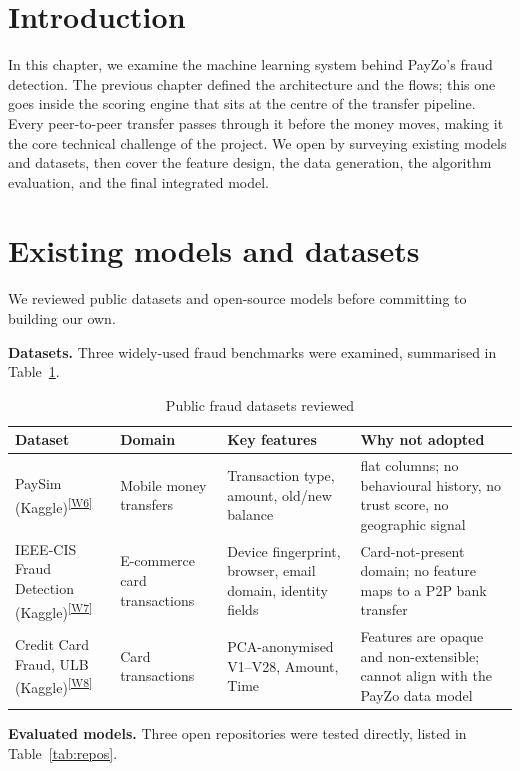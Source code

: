 \documentclass[12pt,a4paper]{report}
\newcommand{\webcite}[2]{\textsuperscript{\hyperref[#1]{[W#2]}}}
\begin{document}
\section{Introduction}

In this chapter, we examine the machine learning system behind PayZo's fraud detection. The
previous chapter defined the architecture and the flows; this one goes inside the scoring
engine that sits at the centre of the transfer pipeline. Every peer-to-peer transfer passes
through it before the money moves, making it the core technical challenge of the project. We
open by surveying existing models and datasets, then cover the feature design, the data
generation, the algorithm evaluation, and the final integrated model.

\section{Existing models and datasets}

We reviewed public datasets and open-source models before committing to building our own.

\vspace{4pt}\noindent\textbf{Datasets.} Three widely-used fraud benchmarks were examined,
summarised in Table~\ref{tab:datasets}.

\begin{table}[H]
\centering
\small
\renewcommand{\arraystretch}{1.2}
\begin{tabularx}{\linewidth}{|>{\raggedright\arraybackslash}p{2.5cm}|>{\raggedright\arraybackslash}p{2.6cm}|>{\raggedright\arraybackslash}X|>{\raggedright\arraybackslash}X|}
\hline
\textbf{Dataset} & \textbf{Domain} & \textbf{Key features} & \textbf{Why not adopted} \\
\hline
PaySim (Kaggle)\webcite{web:paysim}{6} & Mobile money transfers & Transaction type, amount, old/new balance & 6 flat columns; no behavioural history, no trust score, no geographic signal \\
\hline
IEEE-CIS Fraud Detection (Kaggle)\webcite{web:ieeecis}{7} & E-commerce card transactions & Device fingerprint, browser, email domain, identity fields & Card-not-present domain; no feature maps to a P2P bank transfer \\
\hline
Credit Card Fraud, ULB (Kaggle)\webcite{web:ulb}{8} & Card transactions & PCA-anonymised V1--V28, Amount, Time & Features are opaque and non-extensible; cannot align with the PayZo data model \\
\hline
\end{tabularx}
\caption{Public fraud datasets reviewed}
\label{tab:datasets}
\end{table}
\newpage
\vspace{4pt}\noindent\textbf{Evaluated models.} Three open repositories were tested directly,
listed in Table~\ref{tab:repos}.
\end{document}
